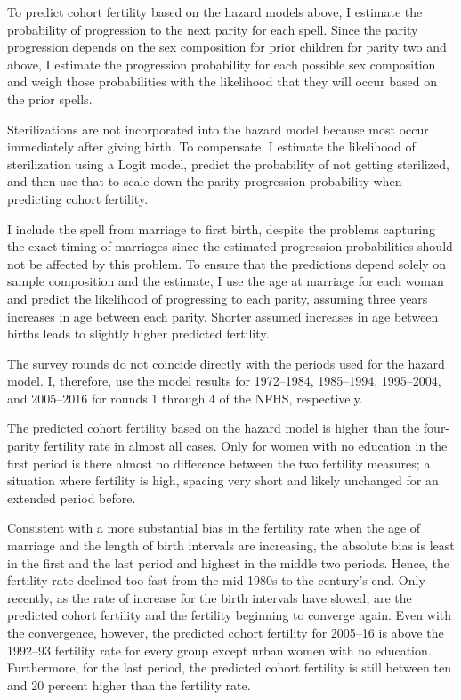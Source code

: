 \documentclass[12pt,letterpaper]{article}
\begin{document}
To predict cohort fertility based on the hazard models above, I estimate the probability 
of progression to the next parity for each spell.
Since the parity progression depends on the sex composition for prior children for parity 
two and above, I estimate the progression probability for each possible sex composition
and weigh those probabilities with the likelihood that they will occur based on the
prior spells.

Sterilizations are not incorporated into the hazard model because most occur
immediately after giving birth. 
To compensate, I estimate the likelihood of sterilization using a Logit model, predict 
the probability of not getting sterilized, and then use that to scale down the parity
progression probability when predicting cohort fertility.

I include the spell from marriage to first birth, despite the problems
capturing the exact timing of marriages since the estimated progression
probabilities should not be affected by this problem.
To ensure that the predictions depend solely on sample composition and the estimate, I
use the age at marriage for each woman and predict the likelihood of progressing to
each parity, assuming three years increases in age between each parity.
Shorter assumed increases in age between births leads to slightly higher predicted 
fertility.

The survey rounds do not coincide directly with the periods used for the hazard model.
I, therefore, use the model results for 1972--1984, 1985--1994, 1995--2004,
and 2005--2016 for rounds 1 through 4 of the NFHS, respectively.


The predicted cohort fertility based on the hazard model is higher than the four-parity 
fertility rate in almost all cases.
Only for women with no education in the first period is there almost no difference 
between the two fertility measures; a situation where fertility is high, spacing
very short and likely unchanged for an extended period before.

Consistent with a more substantial bias in the fertility rate when the age of marriage 
and the length of birth intervals are increasing, the absolute bias is least in the first and the last 
period and highest in the middle two periods.
Hence, the fertility rate declined too fast from the mid-1980s to the century's end.
Only recently, as the rate of increase for the birth intervals have
slowed, are the predicted cohort fertility and the fertility beginning
to converge again.
Even with the convergence, however, the predicted cohort fertility for 2005--16 is 
above the 1992--93 fertility rate for every group except urban women with no education.
Furthermore, for the last period, the predicted cohort fertility is still between ten
and 20 percent higher than the fertility rate. 
\end{document}
